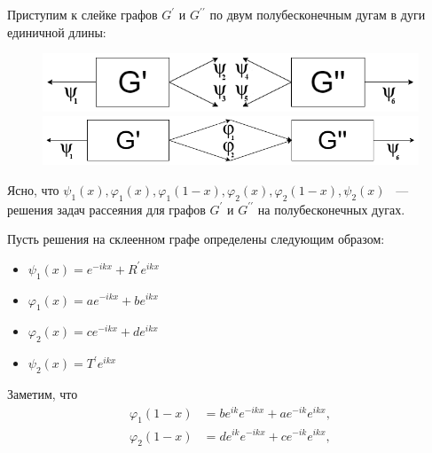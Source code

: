 \documentclass[a4 paper, 12 pt]{extarticle}
\begin{document}
   Приступим к слейке графов $G^\prime$ и $G^{\prime \prime}$ по двум полубесконечным дугам в дуги единичной длины:
   \begin{figure}[!htb]
   	\centering
   	\includegraphics[scale=0.54]{skleika2.png} \\
   	\includegraphics[scale=0.45]{skleika3.png}
   \end{figure}

   Ясно, что $\psi_1\left(x\right), \varphi_1\left(x\right), \varphi_1\left(1-x\right), \varphi_2\left(x\right), \varphi_2\left(1-x\right), \psi_2\left(x\right)$ ~--- решения задач рассеяния для графов  $G^\prime$ и $G^{\prime \prime}$ на полубесконечных дугах.
   
   Пусть решения на склеенном графе определены следующим образом:
   \begin{itemize}
   	\item $ \psi_1\left(x\right) = e^{-ikx} + R^\prime e^{ikx} $
   	\item $ \varphi_1\left(x\right)  = a e^{-ikx} + b e^{ikx} $
   	\item $ \varphi_2\left(x\right) = c e^{-ikx} + d e^{ikx} $
   	\item $ \psi_2\left(x\right) = T^\prime e^{ikx}$
   \end{itemize}
   Заметим, что
   \[
   \begin{aligned}
   \varphi_1\left(1-x\right) &= b e^{ik} e^{-ikx} + a e^{-ik} e^{ikx}, \\
   \varphi_2\left(1-x\right) &= d e^{ik} e^{-ikx} + c e^{-ik} e^{ikx},
   \end{aligned}\]
   
\end{document}
